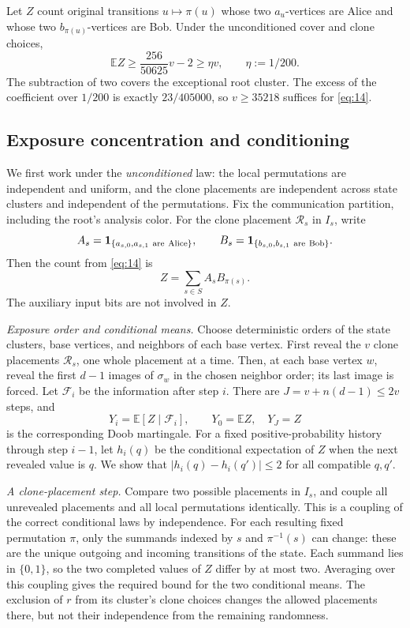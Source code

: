 \documentclass[11pt]{article}
\theoremstyle{definition}
\theoremstyle{remark}
\numberwithin{equation}{section}
\begin{document}
Let \(Z\) count original transitions \(u\mapsto\pi(u)\) whose
two \(a_u\)-vertices are Alice and whose two \(b_{\pi(u)}\)-vertices
are Bob. Under the unconditioned cover and clone choices,
\begin{equation}\label{eq:14}
\mathbb E Z\ge
  \frac{256}{50625}v-2
                             \ge\eta v,\qquad \eta:=1/200.
\end{equation}
The subtraction of two covers the exceptional root cluster.
The excess of the coefficient over \(1/200\) is exactly
\(23/405000\), so \(v\ge35218\) suffices for \eqref{eq:14}.

\subsection{Exposure concentration and conditioning}\label{sub:concentration}
We first work under the \emph{unconditioned} law: the local
permutations are independent and uniform, and the clone placements
are independent across state clusters and independent of the
permutations. Fix the communication partition, including the root's
analysis color. For the clone placement \(\mathcal R_s\) in \(I_s\),
write
\[
 A_s={\bf1}_{\{a_{s,0},a_{s,1}\ {\rm are\ Alice}\}},\qquad
 B_s={\bf1}_{\{b_{s,0},b_{s,1}\ {\rm are\ Bob}\}}.
\]
Then the count from \eqref{eq:14} is
\[
 Z=\sum_{s\in S} A_sB_{\pi(s)}.
\]
The auxiliary input bits are not involved in \(Z\).

\emph{Exposure order and conditional means.}
Choose deterministic orders of the state clusters, base vertices,
and neighbors of each base vertex. First reveal the \(v\) clone
placements \(\mathcal R_s\), one whole placement at a time.
Then, at each base vertex \(w\), reveal the first \(d-1\) images
of \(\sigma_w\) in the chosen neighbor order; its last image is
forced. Let \(\mathcal F_i\) be the information after step \(i\).
There are \(J=v+n(d-1)\le2v\) steps, and
\[
 Y_i=\mathbb E[Z\mid\mathcal F_i],\qquad
 Y_0=\mathbb EZ,\quad Y_J=Z
\]
is the corresponding Doob martingale.
For a fixed positive-probability history through step \(i-1\),
let \(h_i(q)\) be the conditional expectation of \(Z\) when the
next revealed value is \(q\). We show that
\(\lvert h_i(q)-h_i(q')\rvert\le2\) for all compatible \(q,q'\).

\emph{A clone-placement step.}
Compare two possible placements in \(I_s\), and couple all
unrevealed placements and all local permutations identically.
This is a coupling of the correct conditional laws by independence.
For each resulting fixed permutation \(\pi\), only the summands
indexed by \(s\) and \(\pi^{-1}(s)\) can change: these are the
unique outgoing and incoming transitions of the state.
Each summand lies in \(\{0,1\}\), so the two completed values of
\(Z\) differ by at most two. Averaging over this coupling gives
the required bound for the two conditional means. The exclusion
of \(r\) from its cluster's clone choices changes the allowed
placements there, but not their independence from the remaining
randomness.
\end{document}
